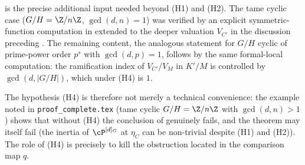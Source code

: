 \medskip
\begin{rem*}\label{rem:lemma-status}
 is the precise additional input needed beyond
(H1) and (H2). The tame cyclic case
($G/H = \Z/n\Z$, $\gcd(d, n) = 1$) was verified by an explicit symmetric-
function computation in
 extended to the deeper valuation
$V_{C'}$ in the discussion preceding . The remaining content,
the analogous statement for $G/H$ cyclic of prime-power order $p^s$ with
$\gcd(d, p) = 1$, follows by the same formal-local computation: the
ramification index of $V_{C'}/V_M$ in $K'/M$ is controlled by
$\gcd(d, |G/H|)$, which under (H4) is $1$.

The hypothesis (H4) is therefore not merely a technical convenience: the
example noted in \texttt{proof\_complete.tex} (tame cyclic $G/H = \Z/n\Z$ with
$\gcd(d, n) > 1$) shows that without (H4) the conclusion of
 genuinely fails, and the theorem may itself
fail (the inertia of $\cP^{[d]_G}$ at $\eta_C$ can be non-trivial despite
(H1) and (H2)). The role of (H4) is precisely to kill the obstruction
located in the comparison map $q$.
\end{rem*}
